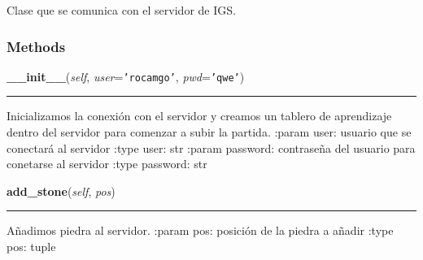     \label{src:igs:Igs}
Clase que se comunica con el servidor de IGS.



  \subsubsection{Methods}

    \label{src:igs:Igs:__init__}

    \vspace{0.5ex}

\hspace{.8\funcindent}\begin{boxedminipage}{\funcwidth}

    \raggedright \textbf{\_\_init\_\_}(\textit{self}, \textit{user}={\tt \texttt{'}\texttt{rocamgo}\texttt{'}}, \textit{pwd}={\tt \texttt{'}\texttt{qwe}\texttt{'}})

    \vspace{-1.5ex}

    \rule{\textwidth}{0.5\fboxrule}
\setlength{\parskip}{2ex}
    Inicializamos la conexión con el servidor y creamos un tablero de 
    aprendizaje dentro del servidor para comenzar a subir la partida. 
    :param user: usuario que se conectará al servidor :type user: str 
    :param password: contraseña del usuario para conetarse al servidor 
    :type password: str

\setlength{\parskip}{1ex}
    \end{boxedminipage}

    \label{src:igs:Igs:add_stone}

    \vspace{0.5ex}

\hspace{.8\funcindent}\begin{boxedminipage}{\funcwidth}

    \raggedright \textbf{add\_stone}(\textit{self}, \textit{pos})

    \vspace{-1.5ex}

    \rule{\textwidth}{0.5\fboxrule}
\setlength{\parskip}{2ex}
    Añadimos piedra al servidor. :param pos: posición de la piedra a añadir
    :type pos: tuple

\setlength{\parskip}{1ex}
    \end{boxedminipage}


